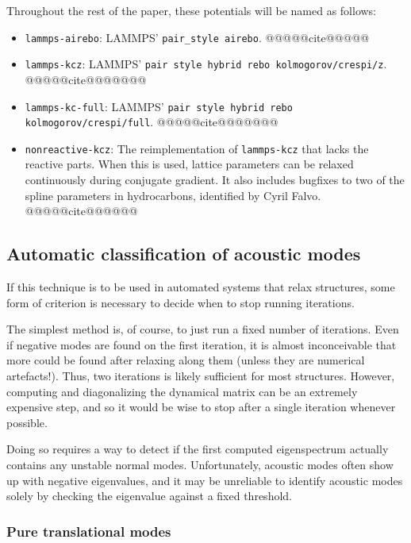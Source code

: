 \documentclass[11pt]{article}
\theoremstyle{definition}
\theoremstyle{remark}
\begin{document}
Throughout the rest of the paper, these potentials will be named as follows:

\begin{itemize}
	\item \verb|lammps-airebo|: LAMMPS' \verb|pair_style airebo|. @@@@@cite@@@@@
	\item \verb|lammps-kcz|: LAMMPS' \verb|pair style hybrid rebo kolmogorov/crespi/z|. @@@@@cite@@@@@@@
	\item \verb|lammps-kc-full|: LAMMPS' \verb|pair style hybrid rebo kolmogorov/crespi/full|. @@@@@cite@@@@@@@
	\item \verb|nonreactive-kcz|: The reimplementation of \verb|lammps-kcz| that lacks the reactive parts.  When this is used, lattice parameters can be relaxed continuously during conjugate gradient.  It also includes bugfixes to two of the spline parameters in hydrocarbons, identified by Cyril Falvo. @@@@@cite@@@@@@
\end{itemize}


\subsection{Automatic classification of acoustic modes}

If this technique is to be used in automated systems that relax structures, some form of criterion is necessary to decide when to stop running iterations.

The simplest method is, of course, to just run a fixed number of iterations.  Even if negative modes are found on the first iteration, it is almost inconceivable that more could be found after relaxing along them (unless they are numerical artefacts!).  Thus, two iterations is likely sufficient for most structures. However, computing and diagonalizing the dynamical matrix can be an extremely expensive step, and so it would be wise to stop after a single iteration whenever possible.

Doing so requires a way to detect if the first computed eigenspectrum actually contains any unstable normal modes.  Unfortunately, acoustic modes often show up with negative eigenvalues, and it may be unreliable to identify acoustic modes solely by checking the eigenvalue against a fixed threshold.

\subsubsection{Pure translational modes}
\end{document}

